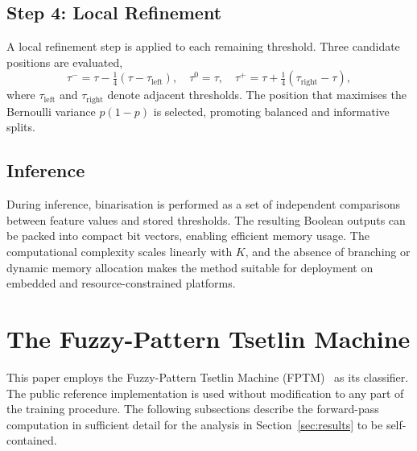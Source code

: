 \documentclass[journal,twoside,web]{ieeecolor}
\begin{document}
\subsection{Step 4: Local Refinement}
\label{subsec:refine}

A local refinement step is applied to each remaining threshold.
Three candidate positions are evaluated,
\begin{equation}
  \tau^{-} = \tau - \tfrac{1}{4}(\tau - \tau_\text{left}), \quad
  \tau^{0} = \tau, \quad
  \tau^{+} = \tau + \tfrac{1}{4}(\tau_\text{right} - \tau),
\end{equation}
where $\tau_\text{left}$ and $\tau_\text{right}$ denote adjacent
thresholds. The position that maximises the Bernoulli variance
$p(1-p)$ is selected, promoting balanced and informative splits.

\subsection{Inference}
\label{subsec:inference}

During inference, binarisation is performed as a set of independent
comparisons between feature values and stored thresholds. The
resulting Boolean outputs can be packed into compact bit vectors,
enabling efficient memory usage. The computational complexity scales
linearly with $K$, and the absence of branching or dynamic memory
allocation makes the method suitable for deployment on embedded and
resource-constrained platforms.


\section{The Fuzzy-Pattern Tsetlin Machine}
\label{sec:fptm}
This paper employs the Fuzzy-Pattern Tsetlin Machine
(FPTM)~\cite{hnilov2025fuzzy} as its classifier. The public
reference implementation is used without modification to any part
of the training procedure. The following subsections describe the
forward-pass computation in sufficient detail for the analysis in
Section~\ref{sec:results} to be self-contained.
\end{document}
